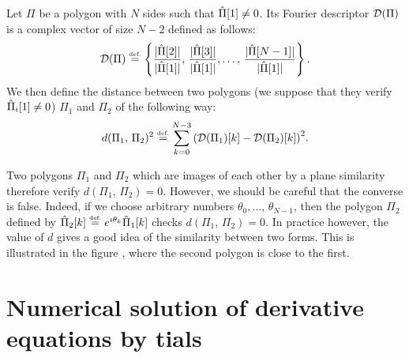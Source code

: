 \begin{defn}
 Let $ \Pi $ be a polygon with $ N $ sides such that $ \hat{\Pi}[1] \neq 0 $. Its Fourier descriptor $ \mathcal{D} (\Pi) $ is a complex vector of size $ N-2 $ defined as follows:
\begin{equation*}
\mathcal{D} (\Pi) \stackrel{\mbox{\upshape\tiny def.}}{=} \left\{\frac{| \hat{\Pi}[2] |}{| \hat{\Pi}[1] |}, \, \frac{| \hat{\Pi}[3] |}{| \hat{\Pi}[1] |}, \ldots, \, \frac{| \hat{\Pi}[N-1] |}{| \hat{\Pi}[1] |} \right\}.
\end{equation*}
 We then define the distance between two polygons (we suppose that they verify $ \hat{\Pi}_i [1] \neq 0 $) $ \Pi_1 $ and $ \Pi_2 $ of the following way:
\begin{equation*}
d (\Pi_1, \, \Pi_2)^2 \stackrel{\mbox{\upshape\tiny def.}}{=} \sum_{k = 0}^{N-3}{\left(\mathcal{D} (\Pi_1) [k] - \mathcal{D} (\Pi_2) [k] \right)^2}.
\end{equation*}
\end{defn}
Two polygons $ \Pi_1 $ and $ \Pi_2 $ which are images of each other by a plane similarity therefore verify $ d (\Pi_1, \, \Pi_2) = 0 $. However, we should be careful that the converse is false. Indeed, if we choose arbitrary numbers $ \theta_0, \ldots, \, \theta_{N-1} $, then the polygon $ \Pi_2 $ defined by $ \hat{\Pi}_2 [k] \stackrel{\mbox{\upshape\tiny def.}}{=} e^{\imath \theta_k} \hat{\Pi}_1 [k] $ checks $ d (\Pi_1, \, \Pi_2) = 0 $. In practice however, the value of $ d $ gives a good idea of the similarity between two forms. This is illustrated in the figure , where the second polygon is close to the first.
\section{Numerical solution of derivative equations by \-tials}
\label{sect1-resolution-edp} 
 
 
 
